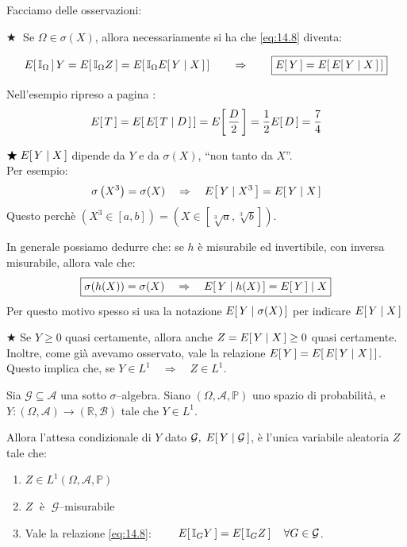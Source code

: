 \noindent Facciamo delle osservazioni:

\bigskip
\noindent \(\bigstar\;\) Se $\Omega\in\sigma(X)$, allora necessariamente si ha che \eqref{eq:14.8} diventa:

\[E\!\left[\,\mathbb{I}_\Omega\,\right] Y = E\!\left[\,\mathbb{I}_\Omega Z\,\right] = E\!\left[\,\mathbb{I}_\Omega E\!\left[\,Y\mid X\,\right]\,\right]\qquad \Rightarrow\qquad \boxed{E\!\left[\,Y\,\right] = E\!\left[\,E\!\left[\,Y\mid X\,\right]\,\right]}\]
\begin{esempio}
\label{es:continuo2}
    Nell'esempio ripreso a pagina \pageref{es:continuo}:
    \[E\!\left[\,T\,\right] = E\!\left[\,E\!\left[\,T\mid D\,\right]\,\right] = E\!\left[\,\frac{D}{2}\,\right] = \frac{1}{2}E\!\left[\,D\,\right] = \frac{7}{4}\]
\end{esempio}

\bigskip
\noindent \(\bigstar\; E\!\left[\,Y\mid X\,\right]\) dipende da $Y$ e da $\sigma(X)$, ``non tanto da $X$''. \\
Per esempio:
\[\sigma\left(X^3\right) = \sigma(X)\quad \Rightarrow\quad E\!\left[\,Y\mid X^3\,\right] = E\!\left[\,Y\mid X\,\right]\]
Questo perchè $\left(X^3\in [a, b]\right) = \left(X\in[\sqrt[3]{a}, \sqrt[3]{b}]\right)$. 

\bigskip
\noindent In generale possiamo dedurre che: se $h$ è misurabile ed invertibile, con inversa misurabile, allora vale che:
\[\boxed{\sigma(h(X)) = \sigma(X) \quad \Rightarrow \quad E\!\left[\,Y\mid h(X)\,\right] = E\!\left[\,Y\,\right]\mid X}\]
Per questo motivo spesso si usa la notazione $E\!\left[\,Y\mid\sigma(X)\,\right]$ per indicare $E\!\left[\,Y\mid X\,\right]$

\bigskip
\noindent \(\bigstar\) Se $Y\geq 0$ quasi certamente, allora anche $Z = E\!\left[\,Y\mid X\,\right]\geq0$ quasi certamente. Inoltre, come già avevamo osservato, vale la relazione $E\!\left[\,Y\,\right] = E\!\left[\,E\!\left[\,Y\mid X\,\right]\,\right]$. Questo implica che, se $Y\in L^1\quad \Rightarrow\quad Z\in L^1$.

\begin{definizione}
\label{def:E_cond2}
    Sia $\mathcal{G}\subseteq \mathcal{A}$ una sotto $\sigma$--algebra. Siano $(\Omega, \mathcal{A}, \mathbb{P})$ uno spazio di probabilità, e $Y:(\Omega, \mathcal{A})\to (\mathbb{R}, \mathcal{B})$ tale che $Y\in L^1$.

    \medskip
    \noindent Allora l'attesa condizionale di $Y$ dato $\mathcal{G},\; E\!\left[\,Y\mid \mathcal{G}\,\right]$, è l'unica variabile aleatoria $Z$ tale che:
    \begin{enumerate}
        \item $Z\in L^1(\Omega, \mathcal{A}, \mathbb{P})$
        \item $Z\;$ è $\;\mathcal{G}$--misurabile
        \item Vale la relazione \eqref{eq:14.8}: $\qquad E\!\left[\,\mathbb{I}_G Y\,\right] = E\!\left[\,\mathbb{I}_G Z\,\right]\quad \forall G\in\mathcal{G}$.
    \end{enumerate}
\end{definizione}

